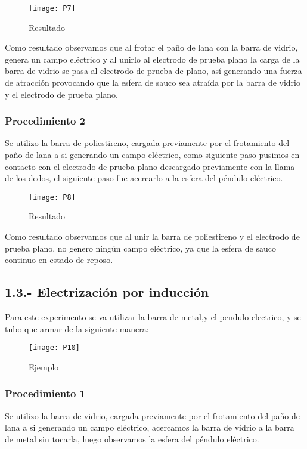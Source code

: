 \documentclass[14pt]{article}
\begin{document}
\begin{figure}[h]
\centering
\texttt{[image: P7]}
\caption{Resultado}
\end{figure}

Como resultado observamos que al frotar el paño de lana con la barra de vidrio, genera un campo eléctrico y al unirlo al electrodo de prueba plano la carga de la barra de vidrio se pasa al electrodo de prueba de plano, así generando una fuerza de atracción provocando que la esfera de sauco sea atraída por la barra de vidrio y el electrodo de prueba plano.
\subsubsection*{Procedimiento 2}
Se utilizo la barra de poliestireno, cargada previamente por el frotamiento del paño de lana a si generando un campo eléctrico, como siguiente paso pusimos en contacto con el electrodo de prueba plano descargado previamente con la llama de los dedos, el siguiente paso fue acercarlo a la esfera del péndulo eléctrico.

\begin{figure}[h]
\centering
\texttt{[image: P8]}
\caption{Resultado}
\end{figure}

Como resultado observamos que al unir la barra de poliestireno y el electrodo de prueba plano, no genero ningún campo eléctrico, ya que la esfera de sauco  continuo en estado de reposo.                                                                    

\subsection*{1.3.- Electrización por inducción}
Para este experimento se va utilizar la barra de metal,y el pendulo electrico, y se tubo que armar de la siguiente manera:


\begin{figure}[h]
\centering
\texttt{[image: P10]}
\caption{Ejemplo}
\end{figure}

\subsubsection*{Procedimiento 1}
Se utilizo la barra de vidrio, cargada previamente por el frotamiento del paño de lana a si generando un campo eléctrico, acercamos la barra de vidrio a la barra de metal sin tocarla, luego observamos la esfera del péndulo eléctrico.
\end{document}
